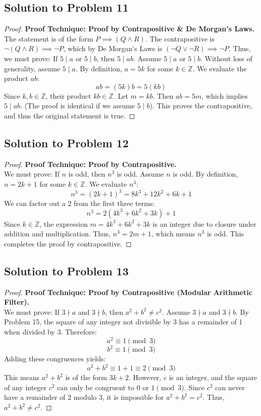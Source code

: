 \documentclass[12pt]{article}
\begin{document}
\subsection{Solution to Problem 11}
\begin{proof}
\textbf{Proof Technique: Proof by Contrapositive \& De Morgan's Laws.} \\
The statement is of the form $P \implies (Q \land R)$. The contrapositive is $\neg(Q \land R) \implies \neg P$, which by De Morgan's Laws is $(\neg Q \lor \neg R) \implies \neg P$.
Thus, we must prove: If $5 \mid a$ or $5 \mid b$, then $5 \mid ab$.
Assume $5 \mid a$ or $5 \mid b$. Without loss of generality, assume $5 \mid a$. By definition, $a = 5k$ for some $k \in \mathbb{Z}$. We evaluate the product $ab$:
\[ ab = (5k)b = 5(kb) \]
Since $k, b \in \mathbb{Z}$, their product $kb \in \mathbb{Z}$. Let $m = kb$. Then $ab = 5m$, which implies $5 \mid ab$. (The proof is identical if we assume $5 \mid b$). This proves the contrapositive, and thus the original statement is true.
\end{proof}

\subsection{Solution to Problem 12}
\begin{proof}
\textbf{Proof Technique: Proof by Contrapositive.} \\
We must prove: If $n$ is odd, then $n^3$ is odd.
Assume $n$ is odd. By definition, $n = 2k + 1$ for some $k \in \mathbb{Z}$. We evaluate $n^3$:
\[ n^3 = (2k + 1)^3 = 8k^3 + 12k^2 + 6k + 1 \]
We can factor out a 2 from the first three terms:
\[ n^3 = 2(4k^3 + 6k^2 + 3k) + 1 \]
Since $k \in \mathbb{Z}$, the expression $m = 4k^3 + 6k^2 + 3k$ is an integer due to closure under addition and multiplication. Thus, $n^3 = 2m + 1$, which means $n^3$ is odd. This completes the proof by contrapositive.
\end{proof}

\subsection{Solution to Problem 13}
\begin{proof}
\textbf{Proof Technique: Proof by Contrapositive (Modular Arithmetic Filter).} \\
We must prove: If $3 \nmid a$ and $3 \nmid b$, then $a^2 + b^2 \neq c^2$.
Assume $3 \nmid a$ and $3 \nmid b$. By Problem 15, the square of any integer not divisible by 3 has a remainder of 1 when divided by 3. Therefore:
\[ a^2 \equiv 1 \pmod 3 \]
\[ b^2 \equiv 1 \pmod 3 \]
Adding these congruences yields:
\[ a^2 + b^2 \equiv 1 + 1 \equiv 2 \pmod 3 \]
This means $a^2 + b^2$ is of the form $3k + 2$. However, $c$ is an integer, and the square of any integer $c^2$ can only be congruent to $0$ or $1 \pmod 3$. Since $c^2$ can never have a remainder of 2 modulo 3, it is impossible for $a^2 + b^2 = c^2$. Thus, $a^2 + b^2 \neq c^2$.
\end{proof}
\end{document}
